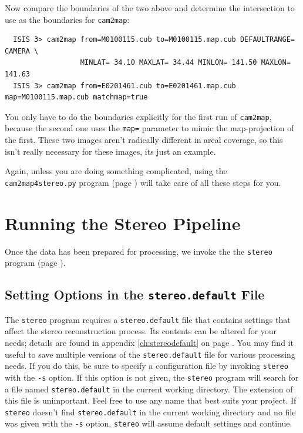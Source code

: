 Now compare the boundaries of the two above and determine the intersection to use as the boundaries for \texttt{cam2map}:

\begin{Verbatim}
  ISIS 3> cam2map from=M0100115.cub to=M0100115.map.cub DEFAULTRANGE= CAMERA \
                  MINLAT= 34.10 MAXLAT= 34.44 MINLON= 141.50 MAXLON= 141.63
  ISIS 3> cam2map from=E0201461.cub to=E0201461.map.cub map=M0100115.map.cub matchmap=true
\end{Verbatim}

You only have to do the boundaries explicitly for the first run of
\texttt{cam2map}, because the second one uses the \texttt{map=}
parameter to mimic the map-projection of the first.  These two
images aren't radically different in areal coverage, so this isn't
really necessary for these images, its just an example.

Again, unless you are doing something complicated, using the
\texttt{cam2map4stereo.py} program (page \pageref{cam2map4stereo})
will take care of all these steps for you.

\section{Running the Stereo Pipeline}

Once the data has been prepared for processing, we invoke the the
\texttt{stereo} program (page \pageref{stereo}).

\subsection{Setting Options in the \texttt{stereo.default} File}
\label{settingoptionsinstereodefault}

The \texttt{stereo} program requires a \texttt{stereo.default} file
that contains settings that affect the stereo reconstruction process.
Its contents can be altered for your needs; details are found in
appendix \ref{ch:stereodefault} on page \pageref{ch:stereodefault}.
You may find it useful to save multiple versions of the
\texttt{stereo.default} file for various processing needs. If you do
this, be sure to specify a configuration file by invoking
\texttt{stereo} with the \texttt{-s} option.  If this option is not
given, the \texttt{stereo} program will search for a file named
\texttt{stereo.default} in the current working directory. The
extension of this file is unimportant. Feel free to use any name that
best suits your project. If \texttt{stereo} doesn't find
\texttt{stereo.default} in the current working directory and no file
was given with the \texttt{-s} option, \texttt{stereo} will assume
default settings and continue.


